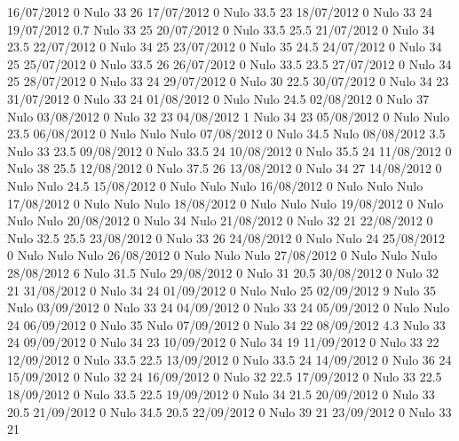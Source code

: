 16/07/2012  0     Nulo    33     26 
17/07/2012  0     Nulo    33.5   23 
18/07/2012  0     Nulo    33     24 
19/07/2012  0.7   Nulo    33     25 
20/07/2012  0     Nulo    33.5   25.5 
21/07/2012  0     Nulo    34     23.5 
22/07/2012  0     Nulo    34     25 
23/07/2012  0     Nulo    35     24.5 
24/07/2012  0     Nulo    34     25 
25/07/2012  0     Nulo    33.5   26 
26/07/2012  0     Nulo    33.5   23.5 
27/07/2012  0     Nulo    34     25 
28/07/2012  0     Nulo    33     24 
29/07/2012  0     Nulo    30     22.5 
30/07/2012  0     Nulo    34     23 
31/07/2012  0     Nulo    33     24 
01/08/2012  0     Nulo   Nulo    24.5 
02/08/2012  0     Nulo    37    Nulo
03/08/2012  0     Nulo    32     23 
04/08/2012  1     Nulo    34     23 
05/08/2012  0     Nulo   Nulo    23.5 
06/08/2012  0     Nulo   Nulo   Nulo
07/08/2012  0     Nulo    34.5  Nulo
08/08/2012  3.5   Nulo    33     23.5 
09/08/2012  0     Nulo    33.5   24 
10/08/2012  0     Nulo    35.5   24 
11/08/2012  0     Nulo    38     25.5 
12/08/2012  0     Nulo    37.5   26 
13/08/2012  0     Nulo    34     27 
14/08/2012  0     Nulo   Nulo    24.5 
15/08/2012  0     Nulo   Nulo   Nulo
16/08/2012  0     Nulo   Nulo   Nulo
17/08/2012  0     Nulo   Nulo   Nulo
18/08/2012  0     Nulo   Nulo   Nulo
19/08/2012  0     Nulo   Nulo   Nulo
20/08/2012  0     Nulo    34    Nulo
21/08/2012  0     Nulo    32     21 
22/08/2012  0     Nulo    32.5   25.5 
23/08/2012  0     Nulo    33     26 
24/08/2012  0     Nulo   Nulo    24 
25/08/2012  0     Nulo   Nulo   Nulo
26/08/2012  0     Nulo   Nulo   Nulo
27/08/2012  0     Nulo   Nulo   Nulo
28/08/2012  6     Nulo    31.5  Nulo
29/08/2012  0     Nulo    31     20.5 
30/08/2012  0     Nulo    32     21 
31/08/2012  0     Nulo    34     24 
01/09/2012  0     Nulo   Nulo    25 
02/09/2012  9     Nulo    35    Nulo
03/09/2012  0     Nulo    33     24 
04/09/2012  0     Nulo    33     24 
05/09/2012  0     Nulo   Nulo    24 
06/09/2012  0     Nulo    35    Nulo
07/09/2012  0     Nulo    34     22 
08/09/2012  4.3   Nulo    33     24 
09/09/2012  0     Nulo    34     23 
10/09/2012  0     Nulo    34     19 
11/09/2012  0     Nulo    33     22 
12/09/2012  0     Nulo    33.5   22.5 
13/09/2012  0     Nulo    33.5   24 
14/09/2012  0     Nulo    36     24 
15/09/2012  0     Nulo    32     24 
16/09/2012  0     Nulo    32     22.5 
17/09/2012  0     Nulo    33     22.5 
18/09/2012  0     Nulo    33.5   22.5 
19/09/2012  0     Nulo    34     21.5 
20/09/2012  0     Nulo    33     20.5 
21/09/2012  0     Nulo    34.5   20.5 
22/09/2012  0     Nulo    39     21 
23/09/2012  0     Nulo    33     21 

